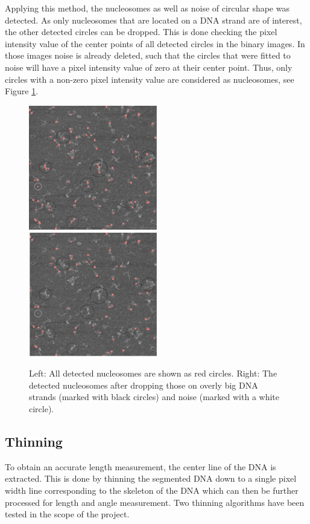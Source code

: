 \documentclass{article}
\begin{document}
Applying this method, the nucleosomes as well as noise of circular shape was detected. As only nucleosomes that are located on a DNA strand are of interest, the other detected circles can be dropped. This is done checking the pixel intensity value of the center points of all detected circles in the binary images. In those images noise is already deleted, such that the circles that were fitted to noise will have a pixel intensity value of zero at their center point. Thus, only circles with a non-zero pixel intensity value are considered as nucleosomes, see Figure \ref{fig: find nukleii}.

\begin{figure}[h!]
\includegraphics[width =0.5\textwidth]{findNukleii_rawCloseAn}
\includegraphics[width =0.5\textwidth]{findNukleii1_rawCloseAn}
\caption{Left: All detected nucleosomes are shown as red circles. Right: The detected nucleosomes after dropping those on overly big DNA strands (marked with black circles) and noise (marked with a white circle).} \label{fig: find nukleii}
\end{figure}
\newpage



\subsection{Thinning}\label{sec:Thinning} %
To obtain an accurate length measurement, the center line of the DNA is extracted. This is done by thinning the segmented DNA down to a single pixel width line corresponding to the skeleton of the DNA which can then be further processed for length and angle measurement. Two thinning algorithms have been tested in the scope of the project.
\end{document}
